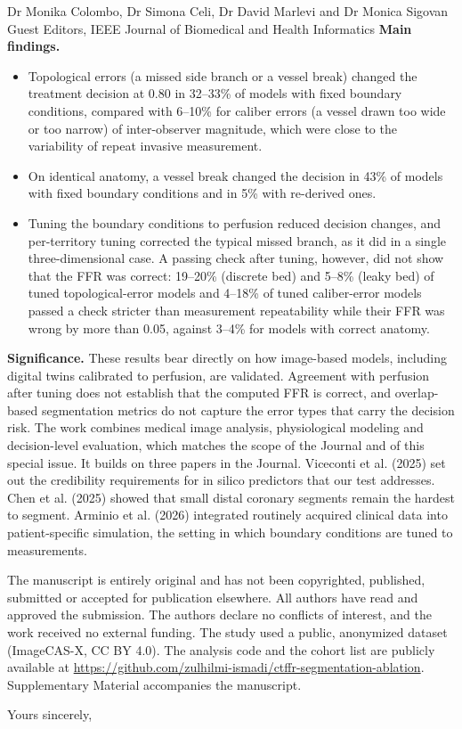 \documentclass[10pt]{letter}
\begin{document}
\begin{letter}{Dr Monika Colombo, Dr Simona Celi, Dr David Marlevi and Dr Monica Sigovan\\Guest Editors, IEEE Journal of Biomedical and Health Informatics}
\textbf{Main findings.}
\begin{itemize}
\item Topological errors (a missed side branch or a vessel break) changed the treatment decision at 0.80 in 32--33\%
of models with fixed boundary conditions, compared with 6--10\% for caliber errors (a vessel drawn too wide or too narrow) of inter-observer magnitude, which
were close to the variability of repeat invasive measurement.
\item On identical anatomy, a vessel break changed the decision in 43\% of models with fixed boundary conditions and
in 5\% with re-derived ones.
\item Tuning the boundary conditions to perfusion reduced decision changes, and per-territory tuning corrected the
typical missed branch, as it did in a single three-dimensional case. A passing check after tuning, however, did not
show that the FFR was correct: 19--20\% (discrete bed) and 5--8\% (leaky bed) of tuned topological-error models and 4--18\% of tuned caliber-error models passed
a check stricter than measurement repeatability while their FFR was wrong by more than 0.05, against 3--4\% for
models with correct anatomy.
\end{itemize}

\textbf{Significance.} These results bear directly on how image-based models, including digital twins calibrated to
perfusion, are validated. Agreement with
perfusion after tuning does not establish that the computed FFR is correct, and overlap-based segmentation metrics do not capture the error types that
carry the decision risk. The work combines medical image analysis, physiological modeling and decision-level
evaluation, which matches the scope of the Journal and of this special issue. It builds on three papers in the
Journal. Viceconti et al. (2025) set out the credibility requirements for in silico predictors that our test
addresses. Chen et al. (2025) showed that small distal coronary segments remain the hardest to segment. Arminio et al.
(2026) integrated routinely acquired clinical data into patient-specific simulation, the setting in which boundary
conditions are tuned to measurements.

The manuscript is entirely original and has not been copyrighted, published, submitted or accepted for publication
elsewhere. All authors have read
and approved the submission. The authors declare no conflicts of interest, and the work received no external funding.
The study used a public, anonymized dataset (ImageCAS-X, CC BY 4.0). The analysis code and the cohort list are publicly available at \url{https://github.com/zulhilmi-ismadi/ctffr-segmentation-ablation}. Supplementary Material accompanies the manuscript.

\closing{Yours sincerely,}
\end{letter}
\end{document}
